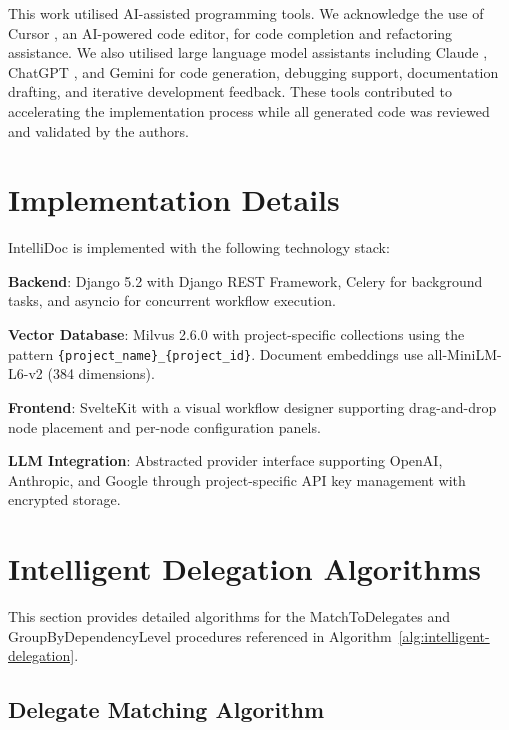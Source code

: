 \documentclass[11pt]{article}
\begin{document}
This work utilised AI-assisted programming tools. We acknowledge the use of Cursor \citep{cursor2024}, an AI-powered code editor, for code completion and refactoring assistance. We also utilised large language model assistants including Claude \citep{anthropic2024claude}, ChatGPT \citep{openai2023gpt4}, and Gemini \citep{team2023gemini} for code generation, debugging support, documentation drafting, and iterative development feedback. These tools contributed to accelerating the implementation process while all generated code was reviewed and validated by the authors.






\clearpage
\appendix

\section{Implementation Details}
\label{app:implementation}

IntelliDoc is implemented with the following technology stack:

\textbf{Backend}: Django 5.2 with Django REST Framework, Celery for background tasks, and asyncio for concurrent workflow execution.

\textbf{Vector Database}: Milvus 2.6.0 with project-specific collections using the pattern \texttt{\{project\_name\}\_\{project\_id\}}. Document embeddings use all-MiniLM-L6-v2 (384 dimensions).

\textbf{Frontend}: SvelteKit with a visual workflow designer supporting drag-and-drop node placement and per-node configuration panels.

\textbf{LLM Integration}: Abstracted provider interface supporting OpenAI, Anthropic, and Google through project-specific API key management with encrypted storage.


\section{Intelligent Delegation Algorithms}
\label{app:delegation-algorithms}

This section provides detailed algorithms for the MatchToDelegates and GroupByDependencyLevel procedures referenced in Algorithm~\ref{alg:intelligent-delegation}.

\subsection{Delegate Matching Algorithm}
\end{document}
